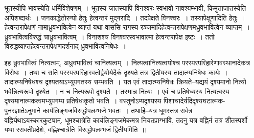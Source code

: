 \documentclass[article,12pt,a4paper]{memoir}
\begin{document}
	भूतस्यीपि भावस्येति धर्मिविशेषणम् । भूतस्य जातस्यापि विनश्वरः स्वभावो नावश्यम्भावी, किमुताजातस्येति अपिशब्दार्थः । जनकाद्धेतोरन्यो हेतुः हेत्वन्तरं मुद्गरादि । तदपेक्षते विनश्वरः । तस्यापेक्षुणादिति हेतुः । हेत्वन्तरापेक्षणं नामाध्रुवभावित्वेन व्याप्तं यथा वाससि रागस्य रञ्जमादिहेत्वन्तरापेक्षणमध्रुवभावित्वेन व्याप्तम् । ध्रुवभावित्वविरुद्धं चाध्रुवभावित्वम् । विनाशश्च विनश्वरस्वभावात्मा हेत्वन्तरापेक्ष इष्टः । ततो विरुद्धव्याप्तहेत्वन्तरापेक्षणदर्शनाद् ध्रुवभावित्वनिषेधः ।  
	  
	इह ध्रुवभावित्वं नित्यत्वम्, अध्रुवभावित्वं चानित्यत्वम् । नित्यत्वानित्यत्वयोश्च परस्परपरिहारेणावस्थानादेकत्र विरोधः । तथा च सति परस्परपरिहारवतोर्द्वयोर्यदैकं दृश्यते तत्र द्वितीयस्य तादात्म्यनिषेधः कार्यः । तादात्म्यनिषेधश्च दृश्यतयाऽभ्युपगतस्य सम्भवति । यत एवं तादात्म्यनिषेधः क्रियते--यद्ययं दृश्यमानो नित्यो भवेन्नित्यरूपो दृश्येत । न च नित्यरूपो दृश्यते । तस्मान्न नित्यः । एवं च प्रतिषेध्यस्य नित्यत्वस्य दृश्यमानात्मकत्वमभ्युपगम्य प्रतिषेधःकृतो भवति । वस्तुनोऽप्यदृश्यस्य पिशाचादेर्यदिदृश्यघटात्मक- पुनरज्ञातेऽनुमाने कार्यलिङ्गजविरुद्धोपलम्भजे भवतः । तथाहि--यत्र धूमस्तत्र सर्वत्र वह्निर्यथाऽयस्कारकुट्याम्, धूमश्चात्रेति कार्यलिङ्गजमेकमत्र नियतप्राग्भावि, तदनु यत्र वह्निर्न तत्र शीतस्पर्शो यथा रसवतीप्रदेशे, वह्निश्चात्रेति विरुद्धोपलम्भजं द्वितीयमिति ॥
	\pend
      
\end{document}
